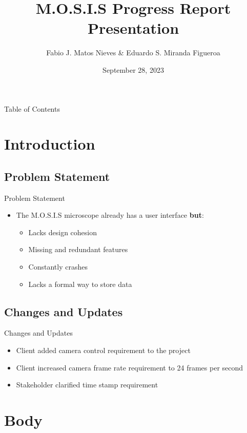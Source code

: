 \documentclass[17pt, aspectratio=169]{beamer}
\title{M.O.S.I.S Progress Report Presentation}
\author[Fabio J. \& Eduardo S.]{Fabio J. Matos Nieves \& Eduardo S. Miranda Figueroa}
\institute[UPRM]{University of Puerto Rico Mayagüez Campus}
\date{September 28, 2023}
\begin{document}
\begin{frame}
	\maketitle
\end{frame}
\begin{frame}{Table of Contents}
	\begin{multicols}{2}
		\begin{spacing}{0.8}
			\tableofcontents
		\end{spacing}
	\end{multicols}
\end{frame}
\section{Introduction}
\subsection{Problem Statement}
\begin{frame}{Problem Statement}
	\begin{itemize}
		\item The M.O.S.I.S microscope already has a user interface \textbf{but}:
		      \begin{itemize}
			      \item Lacks design cohesion
			      \item Missing and redundant features
			      \item Constantly crashes
			      \item Lacks a formal way to store data
		      \end{itemize}
	\end{itemize}
\end{frame}
\subsection{Changes and Updates}
\begin{frame}{Changes and Updates}
	\begin{itemize}
		\item Client added camera control requirement to the project
		\item Client increased camera frame rate requirement to 24 frames per second
		\item Stakeholder clarified time stamp requirement
	\end{itemize}
\end{frame}
\section{Body}
\end{document}
